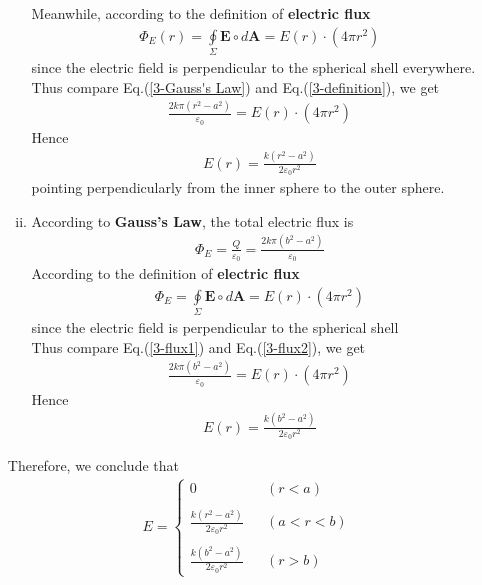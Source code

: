 \documentclass[12pt,a4paper]{article}
\begin{document}
\begin{enumerate}[(a)]
\begin{enumerate}[(i)]
            Meanwhile, according to the definition of \textbf{electric flux}
            \begin{align}
                \Phi_E(r) = \oint\limits_{\Sigma} \textbf{E} \circ d\textbf{A} = E(r) \cdot (4\pi r^2)
                \label{3-definition}
            \end{align}
            since the electric field is perpendicular to the spherical shell everywhere.\\
            Thus compare Eq.(\ref{3-Gauss's Law}) and Eq.(\ref{3-definition}), we get
            \begin{align}
                \frac{2k\pi (r^2-a^2)}{\varepsilon_0} = E(r) \cdot (4\pi r^2)
            \end{align}
            Hence
            \begin{align}
                E(r) = \frac{k(r^2 - a^2)}{2\varepsilon_0r^2}
            \end{align}
            pointing perpendicularly from the inner sphere to the outer sphere.
            \item According to \textbf{Gauss's Law}, the total electric flux is
            \begin{align}
                \Phi_E = \frac{Q}{\varepsilon_0} = \frac{2k\pi (b^2 - a^2)}{\varepsilon_0}
                \label{3-flux1}
            \end{align}
            According to the definition of \textbf{electric flux}
            \begin{align}
                \Phi_E = \oint\limits_{\Sigma} \textbf{E} \circ d\textbf{A} = E(r) \cdot (4\pi r^2)
                \label{3-flux2}
            \end{align}
            since the electric field is perpendicular to the spherical shell\\
            Thus compare Eq.(\ref{3-flux1}) and Eq.(\ref{3-flux2}), we get
            \begin{align}
                \frac{2k\pi (b^2 - a^2)}{\varepsilon_0} = E(r) \cdot (4\pi r^2)
            \end{align}
            Hence
            \begin{align}
                E(r) = \frac{k(b^2 - a^2)}{2\varepsilon_0 r^2}
            \end{align}
        \end{enumerate}
        Therefore, we conclude that
        \begin{align*}
            E = 
            \left\{
                \begin{array}{lcl}
                     0 & & (r < a) \\
                       \\
                     \frac{k(r^2 - a^2)}{2\varepsilon_0r^2} & & (a < r < b) \\
                       \\
                     \frac{k(b^2 - a^2)}{2\varepsilon_0 r^2} & & (r > b)
                \end{array}
            \right.
        \end{align*}
        

\end{enumerate}
\end{document}
